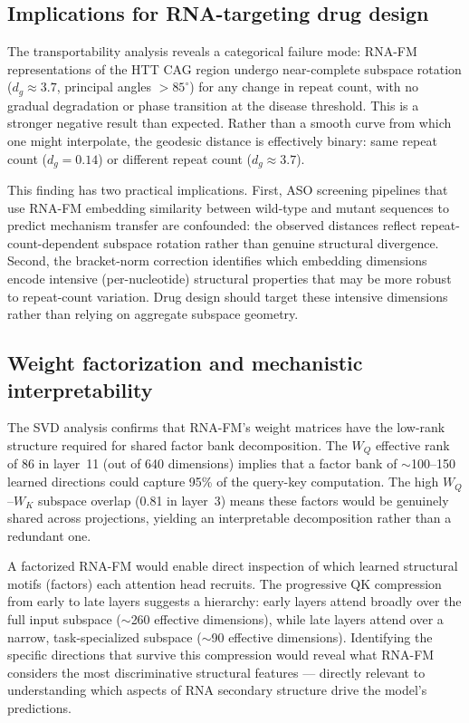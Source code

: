 \documentclass[11pt]{article}
\begin{document}
\subsection{Implications for RNA-targeting drug design}

The transportability analysis reveals a categorical failure mode: RNA-FM
representations of the HTT CAG region undergo near-complete subspace
rotation ($d_g \approx 3.7$, principal angles $> 85^\circ$) for any change
in repeat count, with no gradual degradation or phase transition at the
disease threshold. This is a stronger negative result than expected.
Rather than a smooth curve from which one might interpolate, the
geodesic distance is effectively binary: same repeat count
($d_g = 0.14$) or different repeat count ($d_g \approx 3.7$).

This finding has two practical implications. First, ASO screening
pipelines that use RNA-FM embedding similarity between wild-type and
mutant sequences to predict mechanism transfer are confounded: the
observed distances reflect repeat-count-dependent subspace rotation
rather than genuine structural divergence. Second, the bracket-norm
correction identifies which embedding dimensions encode
intensive (per-nucleotide) structural properties that may be more
robust to repeat-count variation. Drug design should target these
intensive dimensions rather than relying on aggregate subspace
geometry.

\subsection{Weight factorization and mechanistic interpretability}

The SVD analysis confirms that RNA-FM's weight matrices have the
low-rank structure required for shared factor bank decomposition. The
$W_Q$ effective rank of 86 in layer~11 (out of 640 dimensions)
implies that a factor bank of $\sim$100--150 learned directions could
capture 95\% of the query-key computation. The high $W_Q$--$W_K$
subspace overlap (0.81 in layer~3) means these factors would be
genuinely shared across projections, yielding an interpretable
decomposition rather than a redundant one.

A factorized RNA-FM would enable direct inspection of which learned
structural motifs (factors) each attention head recruits. The
progressive QK compression from early to late layers suggests a
hierarchy: early layers attend broadly over the full input subspace
($\sim$260 effective dimensions), while late layers attend over a
narrow, task-specialized subspace ($\sim$90 effective dimensions).
Identifying the specific directions that survive this compression
would reveal what RNA-FM considers the most discriminative structural
features --- directly relevant to understanding which aspects of RNA
secondary structure drive the model's predictions.
\end{document}
